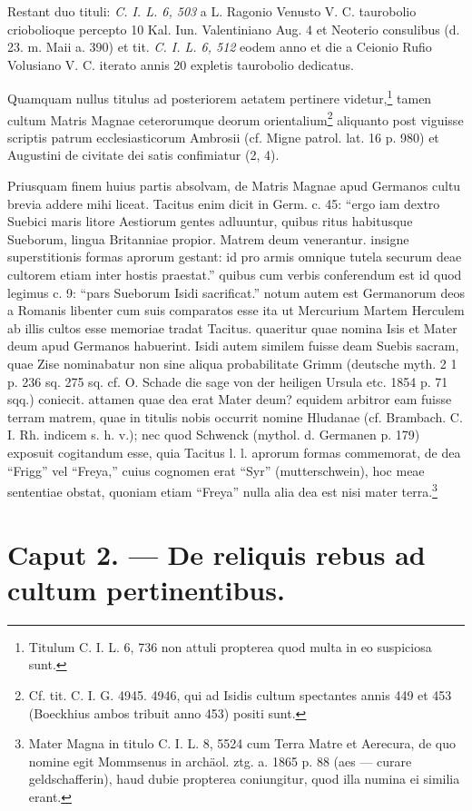 \documentclass[a4paper, 11pt, oneside, polutonikogreek, german, twocolumn]{article}
\begin{document}
Restant duo tituli: \emph{C. I. L. 6, 503} a L. Ragonio Venusto V. C. taurobolio criobolioque percepto 10 Kal. Iun. Valentiniano Aug. 4 et Neoterio consulibus (d. 23. m. Maii a. 390) et tit. \emph{C. I. L. 6, 512} eodem anno et die a Ceionio Rufio Volusiano V. C. iterato annis 20 expletis taurobolio dedicatus.

Quamquam nullus titulus ad posteriorem aetatem pertinere videtur,\footnote{Titulum C. I. L. 6, 736 non attuli propterea quod multa in eo suspiciosa sunt.} tamen cultum Matris Magnae ceterorumque deorum orientalium\footnote{Cf. tit. C. I. G. 4945. 4946, qui ad Isidis cultum spectantes annis 449 et 453 (Boeckhius ambos tribuit anno 453) positi sunt.} aliquanto post viguisse scriptis patrum ecclesiasticorum Ambrosii (cf. Migne patrol. lat. 16 p. 980) et Augustini de civitate dei satis confimiatur (2, 4).

Priusquam finem huius partis absolvam, de Matris Magnae apud Germanos cultu brevia addere mihi liceat. Tacitus enim dicit in Germ. c. 45: "`ergo iam dextro Suebici maris litore Aestiorum gentes adluuntur, quibus ritus habitusque Sueborum, lingua Britanniae propior. Matrem deum venerantur. insigne superstitionis formas aprorum gestant: id pro armis omnique tutela securum deae cultorem etiam inter hostis praestat."' quibus cum verbis conferendum est id quod legimus c. 9: "`pars Sueborum Isidi sacrificat."' notum autem est Germanorum deos a Romanis libenter cum suis comparatos esse ita ut Mercurium Martem Herculem ab illis cultos esse memoriae tradat Tacitus. quaeritur quae nomina Isis et Mater deum apud Germanos habuerint. Isidi autem similem fuisse deam Suebis sacram, quae Zise nominabatur non sine aliqua probabilitate Grimm (deutsche myth. 2 1 p. 236 sq. 275 sq. cf. O. Schade die sage von der heiligen Ursula etc. 1854 p. 71 sqq.) coniecit. attamen quae dea erat Mater deum? equidem arbitror eam fuisse terram matrem, quae in titulis nobis occurrit nomine Hludanae (cf. Brambach. C. I. Rh. indicem s. h. v.); nec quod Schwenck (mythol. d. Germanen p. 179) exposuit cogitandum esse, quia Tacitus l. l. aprorum formas commemorat, de dea "`Frigg"' vel "`Freya,"' cuius cognomen erat "`Syr"' (mutterschwein), hoc meae sententiae obstat, quoniam etiam "`Freya"' nulla alia dea est nisi mater terra.\footnote{Mater Magna in titulo C. I. L. 8, 5524 cum Terra Matre et Aerecura, de quo nomine egit Mommsenus in archäol. ztg. a. 1865 p. 88 (aes --- curare geldschafferin), haud dubie propterea coniungitur, quod illa numina ei similia erant.}
\clearpage
\section{Caput 2. --- De reliquis rebus ad cultum pertinentibus.}
\end{document}
